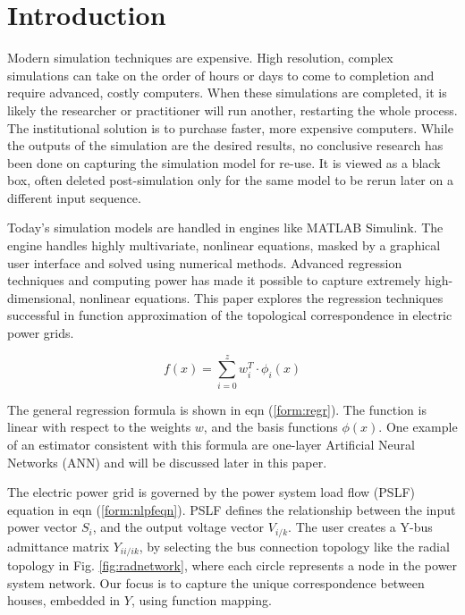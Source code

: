 \documentclass[conference]{IEEEtran}
\begin{document}
%
\IEEEpeerreviewmaketitle


\section{Introduction}
\label{sec:intro}
Modern simulation techniques are expensive. High resolution, complex simulations can take on the order of hours or days to come to completion and require advanced, costly computers. When these simulations are completed, it is likely the researcher or practitioner will run another, restarting the whole process. The institutional solution is to purchase faster, more expensive computers. While the outputs of the simulation are the desired results, no conclusive research has been done on capturing the simulation model for re-use. It is viewed as a black box, often deleted post-simulation only for the same model to be rerun later on a different input sequence.

Today's simulation models are handled in engines like MATLAB Simulink. The engine handles highly multivariate, nonlinear equations, masked by a graphical user interface and solved using numerical methods. Advanced regression techniques and computing power has made it possible to capture extremely high-dimensional, nonlinear equations. This paper explores the regression techniques successful in function approximation of the topological correspondence in electric power grids.

\begin{equation} f(x) = \sum_{i =0}^{z}w_{i}^{T} \cdot \phi_{i}(x) \label{form:regr} \end{equation} 

The general regression formula is shown in eqn (\ref{form:regr}). The function is linear with respect to the weights $w$, and the basis functions $\phi(x)$. One example of an estimator consistent with this formula are one-layer Artificial Neural Networks (ANN) and will be discussed later in this paper.

The electric power grid is governed by the power system load flow (PSLF) equation in eqn (\ref{form:nlpfeqn}). PSLF defines the relationship between the input power vector $S_{i}$, and the output voltage vector $V_{i/k}$. The user creates a Y-bus admittance matrix $Y_{ii/ik}$, by selecting the bus connection topology like the radial topology in Fig. \ref{fig:radnetwork}, where each circle represents a node in the power system network. Our focus is to capture the unique correspondence between houses, embedded in $Y$, using function mapping.
\end{document}
